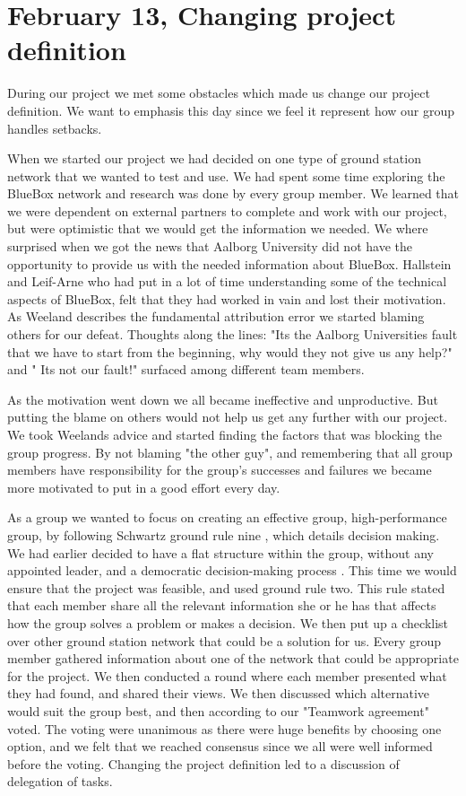 \section{February 13, Changing project definition}

During our project we met some obstacles which made us change our project definition. We want to emphasis this day since we feel it represent how our group handles setbacks.

When we started our project we had decided on one type of ground station network that we wanted to test and use. We had spent some time exploring the BlueBox network and research was done by every group member. We learned that we were dependent on external partners to complete and work with our project, but were optimistic that we would get the information we needed. We where surprised when we got the news that Aalborg University did not have the opportunity to provide us with the needed information about BlueBox. Hallstein and Leif-Arne who had put in a lot of time understanding some of the technical aspects of BlueBox, felt that they had worked in vain and lost their motivation. As Weeland describes the fundamental attribution error \cite{EffectiveTeamMembers} we started blaming others for our defeat. Thoughts along the lines: "Its the Aalborg Universities fault that we have to start from the beginning, why would they not give us any help?" and " Its not our fault!" surfaced among different team members. 

As the motivation went down we all became ineffective and unproductive. But putting the blame on others would not help us get any further with our project. We took Weelands advice and started finding the factors that was blocking the group progress. By not blaming "the other guy", and remembering that all group members have responsibility for the group's successes and failures we became more motivated to put in a good effort every day. 

As a group we wanted to focus on creating an effective group, high-performance group, by following Schwartz ground rule nine \cite{EffectiveGroups}, which details decision making. We had earlier decided to have a flat structure within the group, without any appointed leader, and a democratic decision-making process \cite{EffectiveGroups}. This time we would ensure that the project was feasible, and used ground rule two. This rule stated that each member share all the relevant information she or he has that affects how the group solves a problem or makes a decision. We then put up a checklist over other ground station network that could be a solution for us. Every group member gathered information about one of the network that could be appropriate for the project. We then conducted a round where each member presented what they had found, and shared their views. We then discussed which alternative would suit the group best, and then according to our "Teamwork agreement" voted. The voting were unanimous as there were huge benefits by choosing one option, and we felt that we reached consensus since we all were well informed before the voting. Changing the project definition led to a discussion of delegation of tasks. 

